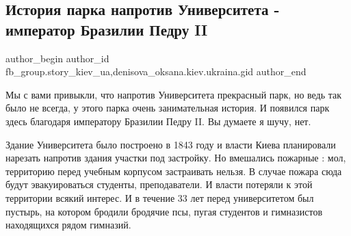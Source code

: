  
 
 
 
 
 
\subsection{История парка напротив Университета - император Бразилии Педру II}
\label{sec:08_12_2021.fb.fb_group.story_kiev_ua.1.park_univer_brazilia}
 
\ifcmt
 author_begin
   author_id fb_group.story_kiev_ua,denisova_oksana.kiev.ukraina.gid
 author_end
\fi

Мы с вами привыкли, что напротив Университета прекрасный парк, но ведь так было
не всегда, у этого парка очень занимательная история. И появился парк здесь
благодаря императору Бразилии  Педру II. Вы думаете я шучу, нет. 

\begin{multicols}{2} %
\setlength{\parindent}{0pt}


\end{multicols} %

Здание Университета было построено в 1843 году и власти Киева планировали
нарезать напротив здания участки под застройку. Но вмешались пожарные : мол,
территорию перед учебным корпусом застраивать нельзя. В случае пожара сюда
будут эвакуироваться студенты, преподаватели. И власти потеряли к этой
территории всякий интерес. И в течение 33 лет перед университетом был пустырь,
на  котором бродили бродячие псы, пугая студентов и гимназистов находящихся
рядом гимназий. 

